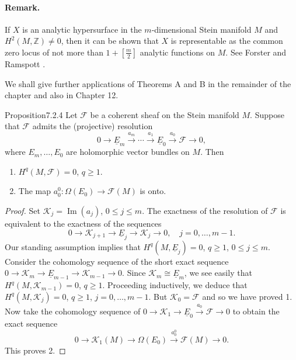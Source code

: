 \paragraph{Remark.} If $X$ is an analytic hypersurface in the $m$-dimensional Stein manifold $M$ and $H^2(M,\mathbb{Z})\neq0$, then it can be shown that $X$ is representable as the common zero locus of not more than $1+[\frac{m}{2}]$ analytic functions on $M$. See Forster and Ramspott \cite[Satz 3]{bib:II:forster-o-and-ramspott-k-j:1}.

We shall give further applications of Theorems A and B in the remainder of the chapter and also in Chapter 12.
\begin{originaltheorem}{Proposition}{7.2.4}
Let $\mathcal{F}$ be a coherent sheaf on the Stein manifold $M$. Suppose that $\mathcal{F}$ admits the (projective) resolution
\[
0\to\underline E_m\xrightarrow{a_m}\cdots\xrightarrow{a_1}\underline E_0\xrightarrow{a_0}\mathcal{F}\to0,
\]
where $E_m,\ldots,E_0$ are holomorphic vector bundles on $M$. Then
\begin{enumerate}[label=\arabic*.]
\item $H^q(M,\mathcal{F})=0$, $q\geq1$.
\item The map $a_0^0:\Omega(E_0)\to\mathcal{F}(M)$ is onto.
\end{enumerate}
\end{originaltheorem}
\begin{proof}
Set $\mathcal{K}_j=\operatorname{Im}(a_j)$, $0\leq j\leq m$. The exactness of the resolution of $\mathcal{F}$ is equivalent to the exactness of the sequences
\[
0\to\mathcal{K}_{j+1}\to\underline E_j\to\mathcal{K}_j\to0,\quad j=0,\ldots,m-1.
\]
Our standing assumption implies that $H^q(M,\underline E_j)=0$, $q\geq1$, $0\leq j\leq m$. Consider the cohomology sequence of the short exact sequence $0\to\mathcal{K}_m\to\underline E_{m-1}\to\mathcal{K}_{m-1}\to0$. Since $\mathcal{K}_m\cong\underline E_m$, we see easily that $H^q(M,\mathcal{K}_{m-1})=0$, $q\geq1$. Proceeding inductively, we deduce that $H^q(M,\mathcal{K}_j)=0$, $q\geq1$, $j=0,\ldots,m-1$. But $\mathcal{K}_0=\mathcal{F}$ and so we have proved 1. Now take the cohomology sequence of $0\to\mathcal{K}_1\to\underline E_0\xrightarrow{a_0}\mathcal{F}\to0$ to obtain the exact sequence
\[
0\to\mathcal{K}_1(M)\to\Omega(E_0)\xrightarrow{a_0^0}\mathcal{F}(M)\to0.
\]
This proves 2.
\end{proof}
